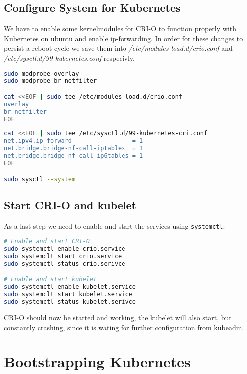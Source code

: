 \subsection{Configure System for Kubernetes}

We have to enable some kernelmodules for CRI-O to function properly with Kubernetes on ubuntu and enable ip-forwarding. In order for these changes to persist a reboot-cycle we save them into \textit{/etc/modules-load.d/crio.conf} and \textit{/etc/sysctl.d/99-kubernetes.conf} respecivly.

\begin{lstlisting}[language=bash,caption=Enable kernelmodules] 
sudo modprobe overlay
sudo modprobe br_netfilter

cat <<EOF | sudo tee /etc/modules-load.d/crio.conf
overlay
br_netfilter
EOF
\end{lstlisting}

\begin{lstlisting}[language=bash,caption=Enable IP-Forwarding] 
cat <<EOF | sudo tee /etc/sysctl.d/99-kubernetes-cri.conf
net.ipv4.ip_forward                 = 1
net.bridge.bridge-nf-call-iptables  = 1
net.bridge.bridge-nf-call-ip6tables = 1
EOF

sudo sysctl --system
\end{lstlisting}

\subsection{Start CRI-O and kubelet}
As a last step we need to enable and start the services using \texttt{systemctl}:

\begin{lstlisting}[language=bash,caption=Starting CRI-O and kubelet services] 
# Enable and start CRI-O
sudo systemctl enable crio.service
sudo systemclt start crio.service
sudo systemctl status crio.serivce

# Enable and start kubelet
sudo systemctl enable kubelet.service
sudo systemclt start kubelet.service
sudo systemctl status kubelet.serivce
\end{lstlisting}
CRI-O should now be started and working, the kubelet will also start, but constantly crashing, since it is wating for further configuration from kubeadm.

\section{Bootstrapping Kubernetes}

